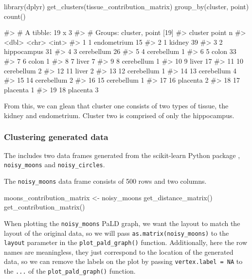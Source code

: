 \begin{Schunk}
\begin{Sinput}
library(dplyr)
get_clusters(tissue_contribution_matrix) %
  group_by(cluster, point) %
  count()
\end{Sinput}
\begin{Soutput}
#> # A tibble: 19 x 3
#> # Groups:   cluster, point [19]
#>    cluster point           n
#>      <dbl> <chr>       <int>
#>  1       1 endometrium    15
#>  2       1 kidney         39
#>  3       2 hippocampus    31
#>  4       3 cerebellum     26
#>  5       4 cerebellum      1
#>  6       5 colon          33
#>  7       6 colon           1
#>  8       7 liver           7
#>  9       8 cerebellum      1
#> 10       9 liver          17
#> 11      10 cerebellum      2
#> 12      11 liver           2
#> 13      12 cerebellum      1
#> 14      13 cerebellum      4
#> 15      14 cerebellum      2
#> 16      15 cerebellum      1
#> 17      16 placenta        2
#> 18      17 placenta        1
#> 19      18 placenta        3
\end{Soutput}
\end{Schunk}

From this, we can glean that cluster one consists of two types of
tissue, the kidney and endometrium. Cluster two is comprised of only the
hippocampus.

\hypertarget{clustering-generated-data}{%
\subsubsection{Clustering generated
data}\label{clustering-generated-data}}

The  includes two data frames generated from the
scikit-learn Python package \citep{pedregosa2011scikit},
\texttt{noisy\_moons} and \texttt{noisy\_circles}.

The \texttt{noisy\_moons} data frame consists of 500 rows and two
columns.

\begin{Schunk}
\begin{Sinput}
moons_contribution_matrix <- noisy_moons %
  get_distance_matrix() %
  get_contribution_matrix()
\end{Sinput}
\end{Schunk}

When plotting the \texttt{noisy\_moons} PaLD graph, we want the layout
to match the layout of the original data, so we will pass
\texttt{as.matrix(noisy\_moons)} to the \texttt{layout} parameter in the
\texttt{plot\_pald\_graph()} function. Additionally, here the row names
are meaningless, they just correspond to the location of the generated
data, so we can remove the labels on the plot by passing
\texttt{vertex.label\ =\ NA} to the \texttt{...} of the
\texttt{plot\_pald\_graph()} function.

